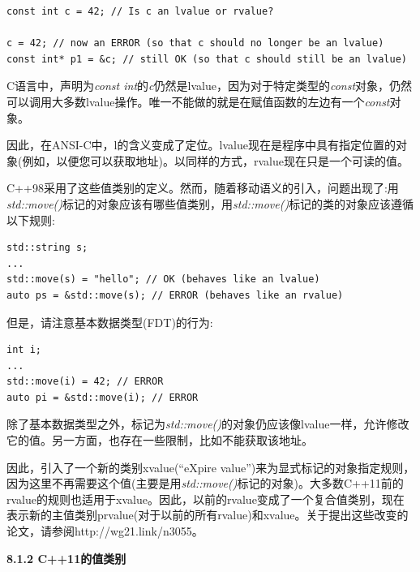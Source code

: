 \begin{lstlisting}[caption={}]
const int c = 42; // Is c an lvalue or rvalue?

c = 42; // now an ERROR (so that c should no longer be an lvalue)
const int* p1 = &c; // still OK (so that c should still be an lvalue)
\end{lstlisting}

C语言中，声明为\textit{const int}的\textit{c}仍然是lvalue，因为对于特定类型的\textit{const}对象，仍然可以调用大多数lvalue操作。唯一不能做的就是在赋值函数的左边有一个\textit{const}对象。\par

因此，在ANSI-C中，l的含义变成了定位。lvalue现在是程序中具有指定位置的对象(例如，以便您可以获取地址)。以同样的方式，rvalue现在只是一个可读的值。\par

C++98采用了这些值类别的定义。然而，随着移动语义的引入，问题出现了:用\textit{std::move()}标记的对象应该有哪些值类别，用\textit{std::move()}标记的类的对象应该遵循以下规则:\par

\begin{lstlisting}[caption={}]
std::string s;
...
std::move(s) = "hello"; // OK (behaves like an lvalue)
auto ps = &std::move(s); // ERROR (behaves like an rvalue)
\end{lstlisting}

但是，请注意基本数据类型(FDT)的行为:\par

\begin{lstlisting}[caption={}]
int i;
...
std::move(i) = 42; // ERROR
auto pi = &std::move(i); // ERROR
\end{lstlisting}

除了基本数据类型之外，标记为\textit{std::move()}的对象仍应该像lvalue一样，允许修改它的值。另一方面，也存在一些限制，比如不能获取该地址。\par

因此，引入了一个新的类别xvalue(“eXpire value”)来为显式标记的对象指定规则，因为这里不再需要这个值(主要是用\textit{std::move()}标记的对象)。大多数C++11前的rvalue的规则也适用于xvalue。因此，以前的rvalue变成了一个复合值类别，现在表示新的主值类别prvalue(对于以前的所有rvalue)和xvalue。关于提出这些改变的论文，请参阅http://wg21.link/n3055。\par

\hspace*{\fill} \par %
\textbf{8.1.2 C++11的值类别}

